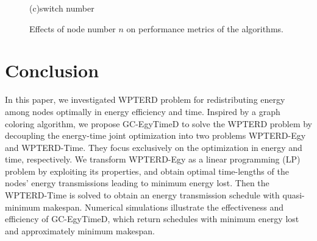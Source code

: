 \documentclass[journal,10pt]{IEEEtran}
\begin{document}
\begin{figure}[!htbp]
{\hspace{0.01\textwidth}%
\begin{minipage}[c]{0.32\textwidth}
\parbox{\linewidth}{\centering\small{(c)switch number}}
\end{minipage}
}
\caption{Effects of node number $n$ on performance metrics of the algorithms.}
\label{fig_sim_n}
\end{figure}


\section{Conclusion}
\label{sec_conclusion}
In this paper, we investigated WPTERD problem for redistributing energy among nodes optimally in energy efficiency and time. Inspired by a graph coloring algorithm, we propose GC-EgyTimeD to solve the WPTERD problem by decoupling the energy-time joint optimization into two problems WPTERD-Egy and WPTERD-Time. They focus exclusively on the optimization in energy and time, respectively. We transform WPTERD-Egy as a linear programming (LP) problem by exploiting its properties, and obtain optimal time-lengths of the nodes' energy transmissions leading to minimum energy lost. Then the WPTERD-Time is solved to obtain an energy transmission schedule with quasi-minimum makespan. Numerical simulations illustrate the effectiveness and efficiency of GC-EgyTimeD, which return schedules with minimum energy lost and approximately minimum makespan.
\end{document}
